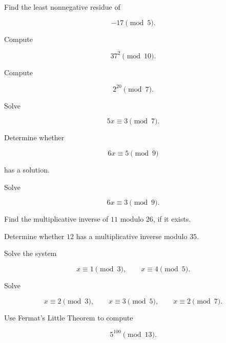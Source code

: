 \begin{exercise}[1]
Find the least nonnegative residue of

\[ -17\pmod5. \]
\end{exercise}

\begin{exercise}[2]
Compute

\[ 37^2\pmod{10}. \]
\end{exercise}

\begin{exercise}[2]
Compute

\[ 2^{20}\pmod7. \]
\end{exercise}

\begin{exercise}[2]
Solve

\[ 5x\equiv3\pmod7. \]
\end{exercise}

\begin{exercise}[2]
Determine whether

\[ 6x\equiv5\pmod9 \]

has a solution.
\end{exercise}

\begin{exercise}[2]
Solve

\[ 6x\equiv3\pmod9. \]
\end{exercise}

\begin{exercise}[2]
Find the multiplicative inverse of \(11\) modulo \(26\), if it exists.
\end{exercise}

\begin{exercise}[2]
Determine whether \(12\) has a multiplicative inverse modulo \(35\).
\end{exercise}

\begin{exercise}[2]
Solve the system

\[ x\equiv1\pmod3,\qquad x\equiv4\pmod5. \]
\end{exercise}

\begin{exercise}[3]
Solve

\[ x\equiv2\pmod3,\qquad x\equiv3\pmod5,\qquad x\equiv2\pmod7. \]
\end{exercise}

\begin{exercise}[2]
Use Fermat's Little Theorem to compute

\[ 5^{100}\pmod{13}. \]
\end{exercise}

